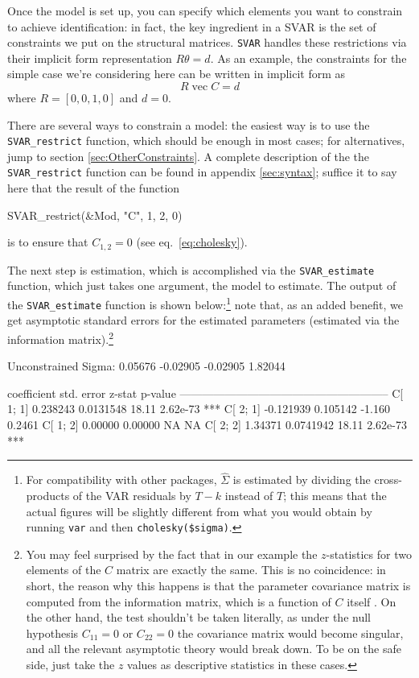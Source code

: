 \documentclass[a4paper,10pt]{article}
\newcounter{script}[section]
\DeclareMathOperator{\VEC}{\mathrm{vec}}
\begin{document}
Once the model is set up, you can specify which elements you want to
constrain to achieve identification: in fact, the key ingredient in a
SVAR is the set of constraints we put on the structural
matrices. \texttt{SVAR} handles these restrictions via their implicit
form representation $R \theta = d$.  As an example, the constraints
for the simple case we're considering here can be written in implicit
form as
\[
  R \VEC C = d
\]
where $R = \left[ 0, 0, 1, 0 \right]$ and $d=0$.

There are several ways to constrain a model: the easiest way is to use
the \texttt{SVAR\_restrict} function, which should be enough in most
cases; for alternatives, jump to section \ref{sec:OtherConstraints}. A
complete description of the the \texttt{SVAR\_restrict} function can
be found in appendix \ref{sec:syntax}; suffice it to say here that the
result of the function
\begin{code}
  SVAR_restrict(&Mod, "C", 1, 2, 0)
\end{code}
is to ensure that $C_{1,2} = 0$ (see eq.~\ref{eq:cholesky}). 

The next step is estimation, which is accomplished via the
\texttt{SVAR\_estimate} function, which just takes one argument, the
model to estimate. The output of the \texttt{SVAR\_estimate} function
is shown below:\footnote{For compatibility with other packages,
  $\hat{\Sigma}$ is estimated by dividing the cross-products of the
  VAR residuals by $T-k$ instead of $T$; this means that the actual
  figures will be slightly different from what you would obtain by
  running \texttt{var} and then \texttt{cholesky(\$sigma)}.} note
that, as an added benefit, we get asymptotic standard errors for the
estimated parameters (estimated via the information
matrix).\footnote{You may feel surprised by the fact that in our
  example the $z$-statistics for two elements of the $C$ matrix are
  exactly the same. This is no coincidence: in short, the reason why
  this happens is that the parameter covariance matrix is computed
  from the information matrix, which is a function of $C$ itself
  \citep[see][for more details]{AG}. On the other hand, the test
  shouldn't be taken literally, as under the null hypothesis
  $C_{11} = 0$ or $C_{22} = 0$ the covariance matrix would become
  singular, and all the relevant asymptotic theory would break
  down. To be on the safe side, just take the $z$ values as
  descriptive statistics in these cases.}

\begin{code}
Unconstrained Sigma:
     0.05676    -0.02905
    -0.02905     1.82044

             coefficient   std. error   z-stat    p-value 
  --------------------------------------------------------
  C[ 1; 1]     0.238243    0.0131548    18.11     2.62e-73 ***
  C[ 2; 1]    -0.121939    0.105142     -1.160    0.2461  
  C[ 1; 2]     0.00000     0.00000      NA       NA       
  C[ 2; 2]     1.34371     0.0741942    18.11     2.62e-73 ***
\end{code}
\end{document}
